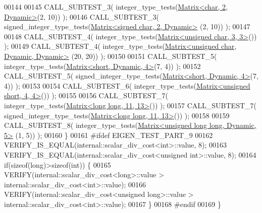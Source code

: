 \begin{DoxyCode}
00144 
00145     CALL\_SUBTEST\_3( integer\_type\_tests(\hyperlink{group___core___module_class_eigen_1_1_matrix}{Matrix<char, 2, Dynamic>}(2, 10)) );
00146     CALL\_SUBTEST\_3( signed\_integer\_type\_tests(\hyperlink{group___core___module_class_eigen_1_1_matrix}{Matrix<signed char, 2, Dynamic>}
      (2, 10)) );
00147 
00148     CALL\_SUBTEST\_4( integer\_type\_tests(\hyperlink{group___core___module_class_eigen_1_1_matrix}{Matrix<unsigned char, 3, 3>}()) );
00149     CALL\_SUBTEST\_4( integer\_type\_tests(\hyperlink{group___core___module_class_eigen_1_1_matrix}{Matrix<unsigned char, Dynamic, Dynamic>}
      (20, 20)) );
00150 
00151     CALL\_SUBTEST\_5( integer\_type\_tests(\hyperlink{group___core___module_class_eigen_1_1_matrix}{Matrix<short, Dynamic, 4>}(7, 4)) );
00152     CALL\_SUBTEST\_5( signed\_integer\_type\_tests(\hyperlink{group___core___module_class_eigen_1_1_matrix}{Matrix<short, Dynamic, 4>}(7, 4)) );
00153 
00154     CALL\_SUBTEST\_6( integer\_type\_tests(\hyperlink{group___core___module_class_eigen_1_1_matrix}{Matrix<unsigned short, 4, 4>}()) );
00155 
00156     CALL\_SUBTEST\_7( integer\_type\_tests(\hyperlink{group___core___module_class_eigen_1_1_matrix}{Matrix<long long, 11, 13>}()) );
00157     CALL\_SUBTEST\_7( signed\_integer\_type\_tests(\hyperlink{group___core___module_class_eigen_1_1_matrix}{Matrix<long long, 11, 13>}()) );
00158 
00159     CALL\_SUBTEST\_8( integer\_type\_tests(\hyperlink{group___core___module_class_eigen_1_1_matrix}{Matrix<unsigned long long, Dynamic, 5>}
      (1, 5)) );
00160   \}
00161 \textcolor{preprocessor}{#ifdef EIGEN\_TEST\_PART\_9}
00162   VERIFY\_IS\_EQUAL(internal::scalar\_div\_cost<int>::value, 8);
00163   VERIFY\_IS\_EQUAL(internal::scalar\_div\_cost<unsigned int>::value, 8);
00164   \textcolor{keywordflow}{if}(\textcolor{keyword}{sizeof}(\textcolor{keywordtype}{long})>\textcolor{keyword}{sizeof}(\textcolor{keywordtype}{int})) \{
00165     VERIFY(internal::scalar\_div\_cost<long>::value > internal::scalar\_div\_cost<int>::value);
00166     VERIFY(internal::scalar\_div\_cost<unsigned long>::value > internal::scalar\_div\_cost<int>::value);
00167   \}
00168 \textcolor{preprocessor}{#endif}
00169 \}
\end{DoxyCode}
